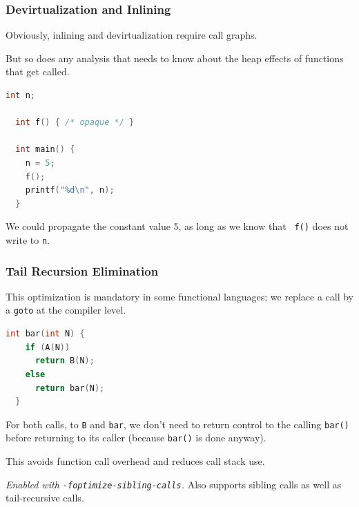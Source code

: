 \begin{frame}[fragile]
\frametitle{Devirtualization and Inlining}

Obviously, inlining and devirtualization require call graphs. 

But so
does any analysis that needs to know about the heap effects of
functions that get called.


\begin{lstlisting}[language=C]
  int n;

  int f() { /* opaque */ }

  int main() {
    n = 5;
    f();
    printf("%d\n", n);
  }
\end{lstlisting}

We could propagate the constant value 5, as long as we know that {\tt
  f()} does not write to {\tt n}.


\end{frame}

\begin{frame}[fragile]
\frametitle{Tail Recursion Elimination}

This optimization is mandatory in some functional languages; we replace a call by a {\tt goto} at the compiler level.

{\small
\begin{lstlisting}[language=C]
  int bar(int N) {
    if (A(N))
      return B(N);
    else
      return bar(N);
  }
\end{lstlisting}
}

For both calls, to {\tt B} and {\tt bar}, we don't need to return control
to the calling {\tt bar()} before returning to its caller (because {\tt bar()}
is done anyway). 

This avoids function call overhead and reduces call stack use.

\noindent \emph{Enabled with {\tt -foptimize-sibling-calls}.} Also supports
sibling calls as well as tail-recursive calls.

\end{frame}



